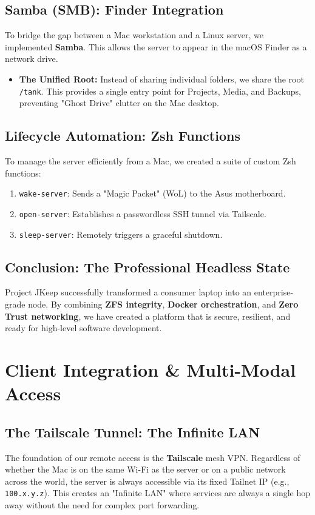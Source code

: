 \documentclass[12pt,a4paper,oneside]{book}
\begin{document}
\section{Samba (SMB): Finder Integration}
To bridge the gap between a Mac workstation and a Linux server, we implemented \textbf{Samba}. This allows the server to appear in the macOS Finder as a network drive.

\begin{itemize}
    \item \textbf{The Unified Root:} Instead of sharing individual folders, we share the root \texttt{/tank}. This provides a single entry point for Projects, Media, and Backups, preventing "Ghost Drive" clutter on the Mac desktop.
\end{itemize}

\section{Lifecycle Automation: Zsh Functions}
To manage the server efficiently from a Mac, we created a suite of custom Zsh functions:
\begin{enumerate}
    \item \texttt{wake-server}: Sends a "Magic Packet" (WoL) to the Asus motherboard.
    \item \texttt{open-server}: Establishes a passwordless SSH tunnel via Tailscale.
    \item \texttt{sleep-server}: Remotely triggers a graceful shutdown.
\end{enumerate}

\section{Conclusion: The Professional Headless State}
Project JKeep successfully transformed a consumer laptop into an enterprise-grade node. By combining \textbf{ZFS integrity}, \textbf{Docker orchestration}, and \textbf{Zero Trust networking}, we have created a platform that is secure, resilient, and ready for high-level software development.

\chapter{Client Integration \& Multi-Modal Access}

\section{The Tailscale Tunnel: The Infinite LAN}
The foundation of our remote access is the \textbf{Tailscale} mesh VPN. Regardless of whether the Mac is on the same Wi-Fi as the server or on a public network across the world, the server is always accessible via its fixed Tailnet IP (e.g., \texttt{100.x.y.z}). This creates an "Infinite LAN" where services are always a single hop away without the need for complex port forwarding.
\end{document}
